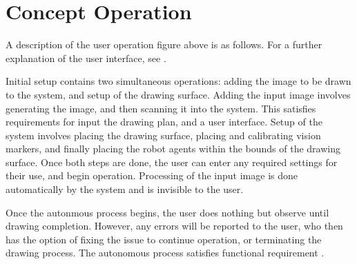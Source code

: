 
\section{Concept Operation}
\label{sec:concept_operation}




A description of the user operation figure above is as follows. For a further explanation of the user interface, see .

Initial setup contains two simultaneous operations: adding the image to be drawn to the system, and setup of the drawing surface. Adding the input image involves generating the image, and then scanning it into the system. This satisfies requirements for input the drawing plan, and a user interface. Setup of the system involves placing the drawing surface, placing and calibrating vision markers, and finally placing the robot agents within the bounds of the drawing surface. Once both steps are done, the user can enter any required settings for their use, and begin operation. Processing of the input image is done automatically by the system and is invisible to the user.

Once the autonmous process begins, the user does nothing but observe until drawing completion. However, any errors will be reported to the user, who then has the option of fixing the issue to continue operation, or terminating the drawing process. The autonomous process satisfies functional requirement .
